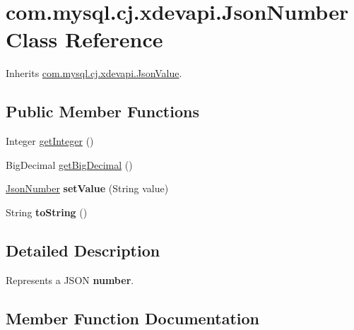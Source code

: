 \hypertarget{classcom_1_1mysql_1_1cj_1_1xdevapi_1_1_json_number}{}\section{com.\+mysql.\+cj.\+xdevapi.\+Json\+Number Class Reference}
\label{classcom_1_1mysql_1_1cj_1_1xdevapi_1_1_json_number}


Inherits \mbox{\hyperlink{interfacecom_1_1mysql_1_1cj_1_1xdevapi_1_1_json_value}{com.\+mysql.\+cj.\+xdevapi.\+Json\+Value}}.

\subsection*{Public Member Functions}
\begin{DoxyCompactItemize}
\item 
Integer \mbox{\hyperlink{classcom_1_1mysql_1_1cj_1_1xdevapi_1_1_json_number_a3e58ec83a320dff5e31a56db7f8daec1}{get\+Integer}} ()
\item 
Big\+Decimal \mbox{\hyperlink{classcom_1_1mysql_1_1cj_1_1xdevapi_1_1_json_number_a325cf86f8fe53619fef22fb48249c5e2}{get\+Big\+Decimal}} ()
\item 
\mbox{\label{classcom_1_1mysql_1_1cj_1_1xdevapi_1_1_json_number_ac9c9fcd92d6adf4adb303efe90ef2779}} 
\mbox{\hyperlink{classcom_1_1mysql_1_1cj_1_1xdevapi_1_1_json_number}{Json\+Number}} {\bfseries set\+Value} (String value)
\item 
\mbox{\label{classcom_1_1mysql_1_1cj_1_1xdevapi_1_1_json_number_acb62be6bedfac5f334be939c14d2b84d}} 
String {\bfseries to\+String} ()
\end{DoxyCompactItemize}


\subsection{Detailed Description}
Represents a J\+S\+ON {\bfseries number}. 

\subsection{Member Function Documentation}
\mbox{\label{classcom_1_1mysql_1_1cj_1_1xdevapi_1_1_json_number_a325cf86f8fe53619fef22fb48249c5e2}} 
